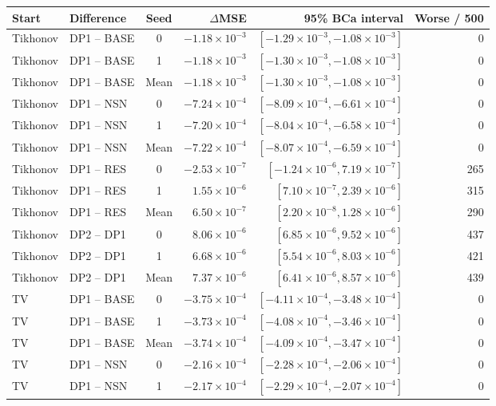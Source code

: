 \begingroup\small\setlength{\tabcolsep}{4pt}\renewcommand{\arraystretch}{1.1}
\begin{tabular}{@{}llcrrr@{}}
\toprule
Start & Difference & Seed & $\Delta$MSE & 95\% BCa interval & Worse / 500 \\ \midrule
Tikhonov & DP1 -- BASE & 0 & $-1.18\times10^{-3}$ & $[-1.29\times10^{-3}, -1.08\times10^{-3}]$ & 0 \\
Tikhonov & DP1 -- BASE & 1 & $-1.18\times10^{-3}$ & $[-1.30\times10^{-3}, -1.08\times10^{-3}]$ & 0 \\
Tikhonov & DP1 -- BASE & Mean & $-1.18\times10^{-3}$ & $[-1.30\times10^{-3}, -1.08\times10^{-3}]$ & 0 \\
Tikhonov & DP1 -- NSN & 0 & $-7.24\times10^{-4}$ & $[-8.09\times10^{-4}, -6.61\times10^{-4}]$ & 0 \\
Tikhonov & DP1 -- NSN & 1 & $-7.20\times10^{-4}$ & $[-8.04\times10^{-4}, -6.58\times10^{-4}]$ & 0 \\
Tikhonov & DP1 -- NSN & Mean & $-7.22\times10^{-4}$ & $[-8.07\times10^{-4}, -6.59\times10^{-4}]$ & 0 \\
Tikhonov & DP1 -- RES & 0 & $-2.53\times10^{-7}$ & $[-1.24\times10^{-6}, 7.19\times10^{-7}]$ & 265 \\
Tikhonov & DP1 -- RES & 1 & $1.55\times10^{-6}$ & $[7.10\times10^{-7}, 2.39\times10^{-6}]$ & 315 \\
Tikhonov & DP1 -- RES & Mean & $6.50\times10^{-7}$ & $[2.20\times10^{-8}, 1.28\times10^{-6}]$ & 290 \\
Tikhonov & DP2 -- DP1 & 0 & $8.06\times10^{-6}$ & $[6.85\times10^{-6}, 9.52\times10^{-6}]$ & 437 \\
Tikhonov & DP2 -- DP1 & 1 & $6.68\times10^{-6}$ & $[5.54\times10^{-6}, 8.03\times10^{-6}]$ & 421 \\
Tikhonov & DP2 -- DP1 & Mean & $7.37\times10^{-6}$ & $[6.41\times10^{-6}, 8.57\times10^{-6}]$ & 439 \\
TV & DP1 -- BASE & 0 & $-3.75\times10^{-4}$ & $[-4.11\times10^{-4}, -3.48\times10^{-4}]$ & 0 \\
TV & DP1 -- BASE & 1 & $-3.73\times10^{-4}$ & $[-4.08\times10^{-4}, -3.46\times10^{-4}]$ & 0 \\
TV & DP1 -- BASE & Mean & $-3.74\times10^{-4}$ & $[-4.09\times10^{-4}, -3.47\times10^{-4}]$ & 0 \\
TV & DP1 -- NSN & 0 & $-2.16\times10^{-4}$ & $[-2.28\times10^{-4}, -2.06\times10^{-4}]$ & 0 \\
TV & DP1 -- NSN & 1 & $-2.17\times10^{-4}$ & $[-2.29\times10^{-4}, -2.07\times10^{-4}]$ & 0 \\

\end{tabular}
